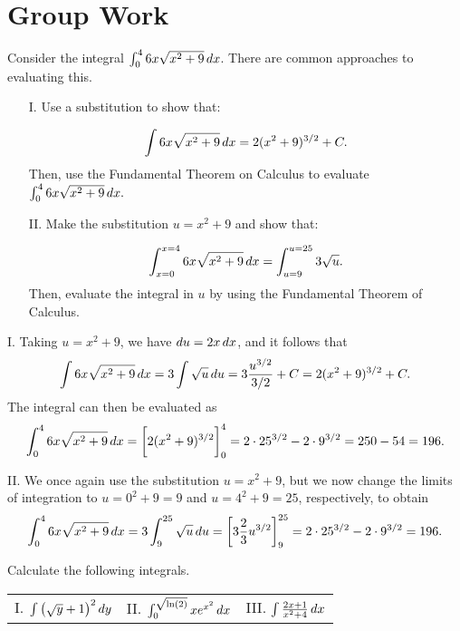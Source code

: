 \documentclass[]{ximera}
\begin{document}
\section{Group Work}

\begin{problem}
Consider the integral $\int_0^4  6x\sqrt{x^2+9} \mathop{}\!d x$.  There are common approaches to evaluating this.

\begin{itemize}
\item[I.] Use a substitution to show that:

\[\int  6x\sqrt{x^2+9} \mathop{}\!d x = 2 (x^2 + 9)^{3/2} + C.\]  
Then, use the Fundamental Theorem on Calculus to evaluate $\int_0^4  6x\sqrt{x^2+9} \mathop{}\!d x.$ 

\item[II.] Make the substitution $u=x^2+9$ and show that:

\[\int_{x=0}^{x=4}  6x\sqrt{x^2+9} \mathop{}\!d x = \int_{u=9}^{u=25} 3\sqrt{u}.\]  Then, evaluate the integral in $u$ by using the Fundamental Theorem of Calculus.
\end{itemize}
\end{problem}

\begin{freeResponse} I. Taking $u=x^2 + 9$, we have $\mathop{}\!d u = 2 x \mathop{}\!d x$, and it follows that
$$
\int  6x\sqrt{x^2+9} \mathop{}\!d x = 3 \int \sqrt{u} \mathop{}\!d u = 3 \frac{u^{3/2}}{3/2} + C = 2 (x^2 + 9)^{3/2} + C. 
$$
The integral can then be evaluated as 
$$
\int_0^4  6x\sqrt{x^2+9} \mathop{}\!d x = \bigg[ 2 (x^2 + 9)^{3/2} \bigg]_0^4 = 2 \cdot 25^{3/2} - 2 \cdot 9^{3/2} = 250 - 54 = 196.
$$

II. We once again use the substitution $u=x^2 + 9$, but we now change the limits of integration to $u=0^2+9=9$ and $u=4^2+9 = 25$, respectively, to obtain
$$
\int_0^4  6x\sqrt{x^2+9} \mathop{}\!d x = 3 \int_9^{25} \sqrt{u} \mathop{}\!d u = \bigg[ 3 \frac{2}{3} u^{3/2} \bigg]_9^{25} = 2 \cdot 25^{3/2} - 2 \cdot 9^{3/2} = 196.
$$
\end{freeResponse}

\begin{problem}
Calculate the following integrals.

\begin{tabular}{lll}
I.  $\int \left(\sqrt{y}+1\right)^2 \mathop{}\!d y$ \hspace{.5in} & II. $\int_0^{\sqrt{\ln(2)}} x e^{x^2} \mathop{}\!d x$ \hspace{.5in} & III. $\int \frac{2x+1}{x^2+4} \mathop{}\!d x$ \hspace{.05in}
\end{tabular}

\end{problem}
\end{document}
